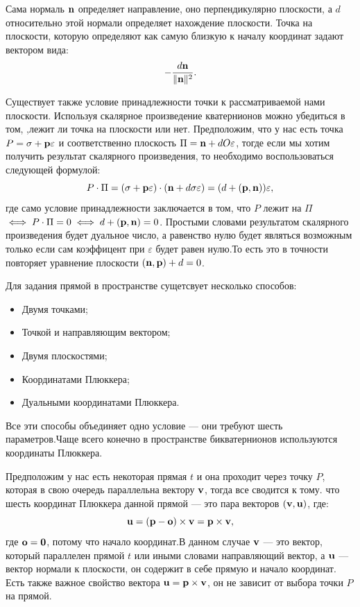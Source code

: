 Сама нормаль $\vb{n}$ определяет направление, оно перпендикулярно плоскости, а $d$ относительно этой нормали определяет нахождение плоскости. Точка на плоскости, которую определяют как самую близкую к началу координат задают вектором вида:
\begin{equation*}
    -\frac{d\vb{n}}{\|\vb{n}\|^2}.
\end{equation*}

Существует также условие принадлежности точки к рассматриваемой нами плоскости. Используя скалярное произведение кватернионов можно убедиться в том, ,лежит ли точка на плоскости или нет. Предположим, что у нас есть точка $P = \sigma + \vb{p}\varepsilon$ и соответственно плоскость $\Pi = \vb{n} + dO\varepsilon$, тогде если мы хотим получить результат скалярного произведения, то необходимо воспользоваться следующей формулой:
\begin{equation*}
    P \cdot \Pi = (\sigma + \vb{p}\varepsilon) \cdot (\vb{n} + d \sigma \varepsilon) = (d + (\vb{p}, \vb{n}))\varepsilon,
\end{equation*}
где само условие принадлежности заключается в том, что $P$ лежит на $\Pi$ $\iff P \cdot \Pi = 0 \iff d + (\vb{p}, \vb{n}) = 0$. Простыми словами результатом скалярного произведения будет дуальное число, а равенство нулю будет являться возможным только если сам коэффицент при $\varepsilon$ будет равен нулю.То есть это в точности повторяет уравнение плоскости $(\vb{n}, \vb{p}) + d = 0$.

Для задания прямой в пространстве сущетсвует несколько способов:
\begin{itemize}
    \item Двумя точками;
    \item Точкой и направляющим вектором;
    \item Двумя плоскостями;
    \item Координатами Плюккера;
    \item Дуальными координатами Плюккера.
\end{itemize}
Все эти способы объединяет одно условие --- они требуют шесть параметров.Чаще всего конечно в пространстве бикватернионов используются координаты Плюккера.

Предположим у нас есть некоторая прямая $t$ и она проходит через точку $P$, которая в свою очередь параллельна вектору $\vb{v}$, тогда все сводится к тому. что шесть координат Плюккера данной прямой --- это пара векторов $(\vb{v}, \vb{u})$, где:
\begin{equation*}
    \vb{u} = (\vb{p} - \vb{o}) \times \vb{v} = \vb{p} \times \vb{v},
\end{equation*}
где $\vb{o} = \vb{0}$, потому что начало координат.В данном случае $\vb{v}$ --- это вектор, который параллелен прямой $t$ или иными словами направляющий вектор, а $\vb{u}$ --- вектор нормали к плоскости, он содержит в себе прямую и начало координат.
Есть также важное свойство вектора $\vb{u} = \vb{p} \times \vb{v}$, он не зависит от выбора точки $P$ на прямой.

